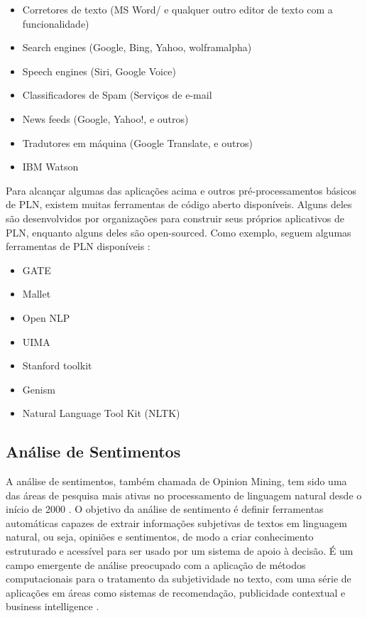 \documentclass[
	12pt,				%
	openright,			%
	oneside,			%
	a4paper,			%
	english,			%
	spanish,			%
	brazil				%
	]{abntex2}
\begin{document}
	\begin{itemize}
	 	\item Corretores de texto (MS Word/ e qualquer outro editor de texto com a funcionalidade)
	 	\item Search engines (Google, Bing, Yahoo, wolframalpha)
	 	\item Speech engines (Siri, Google Voice)
	 	\item Classificadores de Spam (Serviços de e-mail
	 	\item News feeds (Google, Yahoo!, e outros)
	 	\item Tradutores em máquina (Google Translate, e outros)
	 	\item IBM Watson
	\end{itemize}

Para alcançar algumas das aplicações acima e outros pré-processamentos básicos de PLN, existem muitas ferramentas de código aberto disponíveis. Alguns deles são desenvolvidos por organizações para construir seus próprios aplicativos de PLN, enquanto alguns deles são open-sourced. Como exemplo, seguem algumas ferramentas de PLN disponíveis \cite{book_natlang_python}:

	\begin{itemize}
	 	\item GATE
	 	\item Mallet
	 	\item Open NLP
	 	\item UIMA
	 	\item Stanford toolkit
	 	\item Genism
	 	\item Natural Language Tool Kit (NLTK)
	\end{itemize}
	
	\subsection{Análise de Sentimentos}
		A análise de sentimentos, também chamada de Opinion Mining, tem sido uma das áreas de pesquisa mais ativas no processamento de linguagem natural desde o início de 2000 \cite{bliu_2012}. O objetivo da análise de sentimento é definir ferramentas automáticas capazes de extrair informações subjetivas de textos em linguagem natural, ou seja, opiniões e sentimentos, de modo a criar conhecimento estruturado e acessível para ser usado por um sistema de apoio à decisão. É um campo emergente de análise preocupado com a aplicação de métodos computacionais para o tratamento da subjetividade no texto, com uma série de aplicações em áreas como sistemas de recomendação, publicidade contextual e business intelligence \cite{book_discover_practices}.
\end{document}
